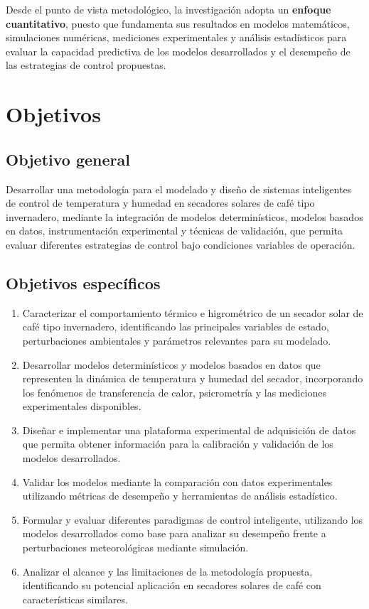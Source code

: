 Desde el punto de vista metodológico, la investigación adopta un \textbf{enfoque cuantitativo}, puesto que fundamenta sus resultados en modelos matemáticos, simulaciones numéricas, mediciones experimentales y análisis estadísticos para evaluar la capacidad predictiva de los modelos desarrollados y el desempeño de las estrategias de control propuestas.


\section{Objetivos}
\label{intro:objetivos}

\subsection{Objetivo general}
Desarrollar una metodología para el modelado y diseño de sistemas inteligentes de control de temperatura y humedad en secadores solares de café tipo invernadero, mediante la integración de modelos determinísticos, modelos basados en datos, instrumentación experimental y técnicas de validación, que permita evaluar diferentes estrategias de control bajo condiciones variables de operación.

\subsection{Objetivos específicos}
\begin{enumerate}

\item Caracterizar el comportamiento térmico e higrométrico de un secador solar de café tipo invernadero, identificando las principales variables de estado, perturbaciones ambientales y parámetros relevantes para su modelado.

\item Desarrollar modelos determinísticos y modelos basados en datos que representen la dinámica de temperatura y humedad del secador, incorporando los fenómenos de transferencia de calor, psicrometría y las mediciones experimentales disponibles.

\item Diseñar e implementar una plataforma experimental de adquisición de datos que permita obtener información para la calibración y validación de los modelos desarrollados.

\item Validar los modelos mediante la comparación con datos experimentales utilizando métricas de desempeño y herramientas de análisis estadístico.

\item Formular y evaluar diferentes paradigmas de control inteligente, utilizando los modelos desarrollados como base para analizar su desempeño frente a perturbaciones meteorológicas mediante simulación.

\item Analizar el alcance y las limitaciones de la metodología propuesta, identificando su potencial aplicación en secadores solares de café con características similares.

\end{enumerate}


